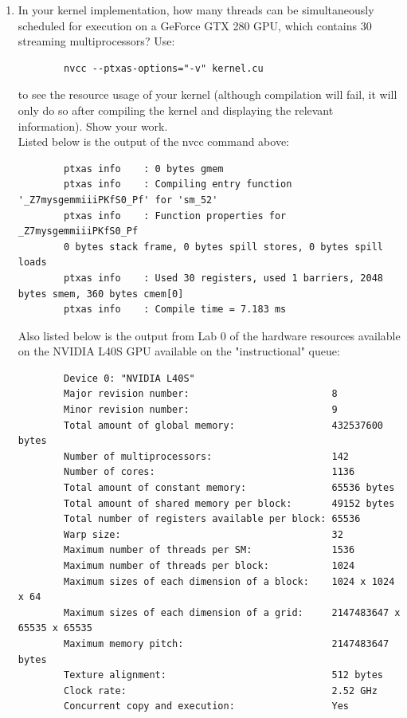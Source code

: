 \documentclass{article}
\begin{document}
\begin{enumerate}
	\item In your kernel implementation, how many threads can be simultaneously scheduled for execution on a GeForce GTX 280 GPU, which contains 30 streaming multiprocessors? Use:
	\begin{verbatim}
		nvcc --ptxas-options="-v" kernel.cu
	\end{verbatim}
	to see the resource usage of your kernel (although compilation will fail, it will only do so after compiling the kernel and displaying the relevant information). Show your work.\\
	
	Listed below is the output of the nvcc command above:
	\begin{verbatim}
		ptxas info    : 0 bytes gmem
		ptxas info    : Compiling entry function '_Z7mysgemmiiiPKfS0_Pf' for 'sm_52'
		ptxas info    : Function properties for _Z7mysgemmiiiPKfS0_Pf
		0 bytes stack frame, 0 bytes spill stores, 0 bytes spill loads
		ptxas info    : Used 30 registers, used 1 barriers, 2048 bytes smem, 360 bytes cmem[0]
		ptxas info    : Compile time = 7.183 ms
	\end{verbatim}
	
	Also listed below is the output from Lab 0 of the hardware resources available on the NVIDIA L40S GPU available on the "instructional" queue:
	\begin{verbatim}
		Device 0: "NVIDIA L40S"
		Major revision number:                         8
		Minor revision number:                         9
		Total amount of global memory:                 432537600 bytes
		Number of multiprocessors:                     142
		Number of cores:                               1136
		Total amount of constant memory:               65536 bytes
		Total amount of shared memory per block:       49152 bytes
		Total number of registers available per block: 65536
		Warp size:                                     32
		Maximum number of threads per SM:              1536
		Maximum number of threads per block:           1024
		Maximum sizes of each dimension of a block:    1024 x 1024 x 64
		Maximum sizes of each dimension of a grid:     2147483647 x 65535 x 65535
		Maximum memory pitch:                          2147483647 bytes
		Texture alignment:                             512 bytes
		Clock rate:                                    2.52 GHz
		Concurrent copy and execution:                 Yes
	\end{verbatim}
	

\end{enumerate}
\end{document}
